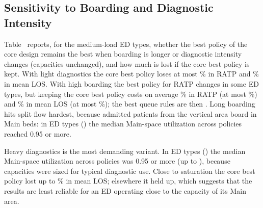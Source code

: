\subsection{Sensitivity to Boarding and Diagnostic Intensity}
\label{sec:res:sens}

Table~ reports, for the \NMediumTypes{} medium-load ED types, whether the best policy of the core design remains the best when boarding is longer or diagnostic intensity changes (capacities unchanged), and how much is lost if the core best policy is kept. With light diagnostics the core best policy loses at most \SensLightDiagnosticsRatpRegretMax\% in RATP and \SensLightDiagnosticsLosAllMeanRegretMax\% in mean LOS. With high boarding the best policy for RATP changes in some ED types, but keeping the core best policy costs on average \SensHighBoardingRatpRegret\% in RATP (at most \SensHighBoardingRatpRegretMax\%) and \SensHighBoardingLosAllMeanRegret\% in mean LOS (at most \SensHighBoardingLosAllMeanRegretMax\%); the best queue rules are then \SensHighBoardingBestQueues. Long boarding hits split flow hardest, because admitted patients from the vertical area board in Main beds: in \SensHighBoardingNearSat{} ED types (\SensHighBoardingNearSatList) the median Main-space utilization across policies reached 0.95 or more.

Heavy diagnostics is the most demanding variant. In \SensHeavyDiagnosticsNearSat{} ED types (\SensHeavyDiagnosticsNearSatList) the median Main-space utilization across policies was 0.95 or more (up to \SensHeavyDiagnosticsUtilMax), because capacities were sized for typical diagnostic use. Close to saturation the core best policy lost up to \SensHeavyDiagnosticsLosAllMeanRegretMax\% in mean LOS; elsewhere it held up, which suggests that the results are least reliable for an ED operating close to the capacity of its Main area.

